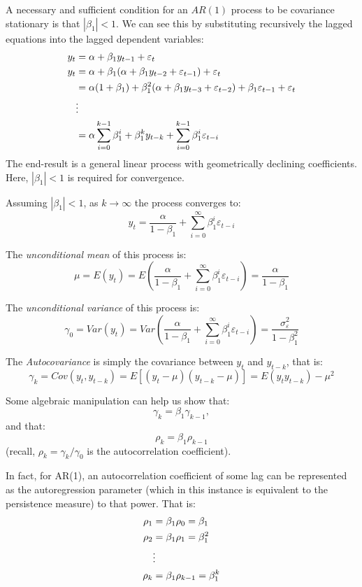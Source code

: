 \documentclass[
  12pt,
  oneside]{book}
\begin{document}
A necessary and sufficient condition for an \(AR(1)\) process to be covariance stationary is that \(|\beta_1| < 1\). We can see this by substituting recursively the lagged equations into the lagged dependent variables:
\[
\begin{aligned}
y_t &= \alpha + \beta_1 y_{t-1} + \varepsilon_t \notag \\
y_t &= \alpha + \beta_1 (\alpha + \beta_1 y_{t-2} + \varepsilon_{t-1}) + \varepsilon_t \notag \\
&= \alpha(1+\beta_1) + \beta_1^2 (\alpha + \beta_1 y_{t-3} + \varepsilon_{t-2}) + \beta_1\varepsilon_{t-1} + \varepsilon_t \notag \\
&\vdots  \notag \\
&= \alpha\sum_{i=0}^{k-1}\beta_1^i + \beta_1^k y_{t-k} + \sum_{i=0}^{k-1}\beta_1^i\varepsilon_{t-i}
\end{aligned}
\]
The end-result is a general linear process with geometrically declining coefficients. Here, \(|\beta_1| < 1\) is required for convergence.

Assuming \(|\beta_1| < 1\), as \(k \to \infty\) the process converges to: \[y_t = \frac{\alpha}{1-\beta_1} + \sum_{i=0}^{\infty}\beta_1^i\varepsilon_{t-i}\]

The \emph{unconditional mean} of this process is: \[\mu = E\left(y_t\right) = E\left(\frac{\alpha}{1-\beta_1} + \sum_{i=0}^{\infty}\beta_1^i\varepsilon_{t-i}\right) = \frac{\alpha}{1-\beta_1}\]

The \emph{unconditional variance} of this process is: \[\gamma_0 = Var\left(y_t\right) = Var\left(\frac{\alpha}{1-\beta_1} + \sum_{i=0}^{\infty}\beta_1^i\varepsilon_{t-i}\right) = \frac{\sigma_{\varepsilon}^2}{1-\beta_1^2}\]

The \emph{Autocovariance} is simply the covariance between \(y_t\) and \(y_{t-k}\), that is: \[\gamma_k = Cov(y_t,y_{t-k}) = E[(y_t - \mu)(y_{t-k} - \mu)] = E(y_t y_{t-k}) - \mu^2\]

Some algebraic manipulation can help us show that: \[\gamma_k = \beta_1\gamma_{k-1},\] and that: \[\rho_{k} = \beta_1\rho_{k-1}\] (recall, \(\rho_k = \gamma_k/\gamma_0\) is the autocorrelation coefficient).

In fact, for AR(1), an autocorrelation coefficient of some lag can be represented as the autoregression parameter (which in this instance is equivalent to the persistence measure) to that power. That is:
\[
\begin{aligned}
\rho_1 &= \beta_1\rho_0 = \beta_1 \notag \\
\rho_2 &= \beta_1\rho_1 = \beta_1^2 \notag \\
&\vdots \notag \\
\rho_k &= \beta_1\rho_{k-1} = \beta_1^k
\end{aligned}
\]
\end{document}
